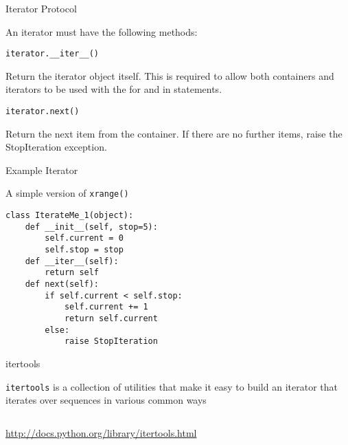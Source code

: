 \documentclass{beamer}
\begin{document}
\begin{frame}[fragile]{Iterator Protocol}

{\Large An iterator must have the following methods:}

\begin{verbatim}
iterator.__iter__()
\end{verbatim}

Return the iterator object itself. This is required to allow both containers
and iterators to be used with the for and in statements.

\begin{verbatim}
iterator.next()
\end{verbatim}

Return the next item from the container. If there are no further items,
raise the StopIteration exception.

\end{frame} 


\begin{frame}[fragile]{Example Iterator}

{\Large A simple version of \verb|xrange()|}

\begin{verbatim}
class IterateMe_1(object):
    def __init__(self, stop=5):
        self.current = 0
        self.stop = stop
    def __iter__(self):
        return self
    def next(self):
        if self.current < self.stop:
            self.current += 1
            return self.current
        else:
            raise StopIteration
\end{verbatim}

\end{frame} 

\begin{frame}[fragile]{itertools}

{\Large \verb|itertools| is a collection of utilities that make it easy to
build an iterator that iterates over sequences in various common ways}

\begin{verbatim}

\end{verbatim}

\url{http://docs.python.org/library/itertools.html}

\end{frame}
\end{document}
